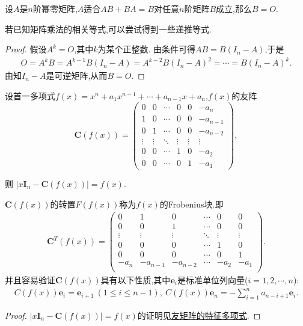 \documentclass[../../main.tex]{subfiles}%
\begin{document}
\begin{example}
设\(A\)是\(n\)阶幂零矩阵,\(A\)适合\(AB+BA=B\)对任意\(n\)阶矩阵\(B\)成立,那么\(B = O\).
\end{example}
\begin{note}
若已知矩阵乘法的相关等式,可以尝试得到一些递推等式.
\end{note}
\begin{proof}
假设\(A^k = O\),其中\(k\)为某个正整数. 由条件可得\(AB = B(I_n - A)\),于是
\begin{align*}
O=A^kB=A^{k-1}B(I_n-A)=A^{k-2}B(I_n-A)^2=\cdots =B(I_n-A)^k.
\end{align*}
由知\(I_n - A\)是可逆矩阵,从而\(B = O\).
\end{proof}


\begin{proposition}[多项式的友矩阵和Frobenius块]\label{proposition:多项式的友矩和Frobenius块}
设首一多项式\(f(x)=x^{n}+a_{1}x^{n - 1}+\cdots+a_{n - 1}x + a_{n}\),\(f(x)\)的友阵
\[
\boldsymbol{C}(f(x))=\left(\begin{array}{cccccc}
0 & 0 & \cdots & 0 & 0 & -a_{n} \\
1 & 0 & \cdots & 0 & 0 & -a_{n - 1} \\
0 & 1 & \cdots & 0 & 0 & -a_{n - 2} \\
\vdots & \vdots & \ddots & \vdots & \vdots & \vdots \\
0 & 0 & \cdots & 1 & 0 & -a_{2} \\
0 & 0 & \cdots & 0 & 1 & -a_{1}
\end{array}\right),
\]

则
\(\vert x\boldsymbol{I}_{n}-\boldsymbol{C}(f(x))\vert=f(x)\).

\(\boldsymbol{C}(f(x))\)的转置\(F(f(x))\)称为\(f(x)\)的Frobenius块.即
\begin{align*}
\boldsymbol{C}^T(f(x))=\left( \begin{matrix}
0&		1&		0&		\cdots&		0&		0\\
0&		0&		1&		\cdots&		0&		0\\
\vdots&		\vdots&		\vdots&		\ddots&		\vdots&		\vdots\\
0&		0&		0&		\cdots&		1&		0\\
0&		0&		0&		\cdots&		0&		1\\
-a_n&		-a_{n-1}&		-a_{n-2}&		\cdots&		-a_2&		-a_1\\
\end{matrix} \right).
\end{align*}
并且容易验证$\boldsymbol{C}(f(x))$具有以下性质,其中$\boldsymbol{e}_i$是标准单位列向量($i=1,2,\cdots,n$):
\begin{align*}
C(f(x))\boldsymbol{e}_i = \boldsymbol{e}_{i + 1} \ (1 \leqslant  i \leqslant  n - 1), \ C(f(x))\boldsymbol{e}_n = - \sum_{i = 1}^{n} a_{n - i + 1} \boldsymbol{e}_i .
\end{align*}
\end{proposition}
\begin{proof}
\(\vert x\boldsymbol{I}_{n}-\boldsymbol{C}(f(x))\vert=f(x)\)的证明见\hyperref[proposition:多项式的友阵的特征多项式与特征值]{友矩阵的特征多项式}.
\end{proof}
\end{document}
